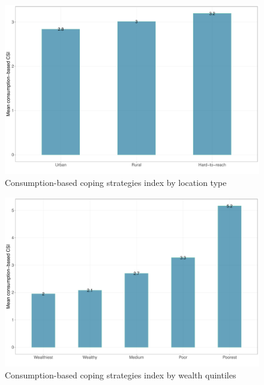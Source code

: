 \documentclass[12pt,a4paper]{article}
\begin{document}
\newpage

\begin{figure}[H]

{\centering \includegraphics{kayahReport_files/figure-latex/ccsi1plot-1} 

}

\caption{Consumption-based coping strategies index by location type}\label{fig:ccsi1plot}
\end{figure}

\begin{figure}[H]

{\centering \includegraphics{kayahReport_files/figure-latex/ccsi2plot-1} 

}

\caption{Consumption-based coping strategies index by wealth quintiles}\label{fig:ccsi2plot}
\end{figure}
\end{document}
